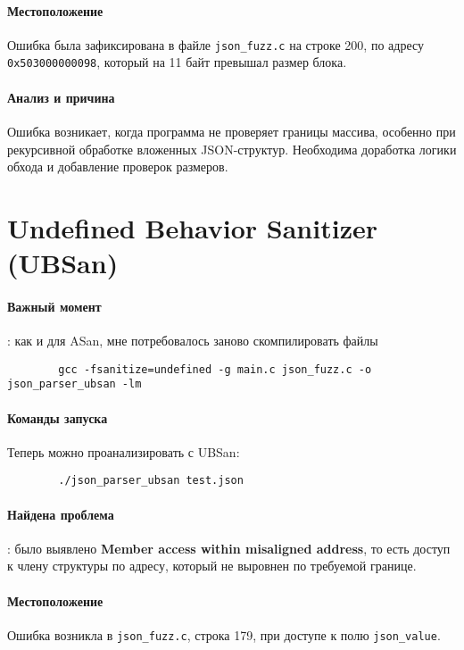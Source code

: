     \paragraph{Местоположение} Ошибка была зафиксирована в файле \texttt{json\_fuzz.c} на строке 200, по адресу \texttt{0x503000000098}, который на 11 байт превышал размер блока.

    \paragraph{Анализ и причина} Ошибка возникает, когда программа не проверяет границы массива, особенно при рекурсивной обработке вложенных JSON-структур.
    Необходима доработка логики обхода и добавление проверок размеров.


    \section{Undefined Behavior Sanitizer (UBSan)}

    \paragraph{Важный момент}: как и для ASan, мне потребовалось заново скомпилировать файлы
    \begin{verbatim}
        gcc -fsanitize=undefined -g main.c json_fuzz.c -o json_parser_ubsan -lm
    \end{verbatim}

    \paragraph{Команды запуска} Теперь можно проанализировать с UBSan:
    \begin{verbatim}
        ./json_parser_ubsan test.json
    \end{verbatim}

    \paragraph{Найдена проблема}: было выявлено \textbf{Member access within misaligned address}, то есть доступ к члену структуры по адресу, который не выровнен по требуемой границе.

    \paragraph{Местоположение} Ошибка возникла в \texttt{json\_fuzz.c}, строка 179, при доступе к полю \texttt{json\_value}.


